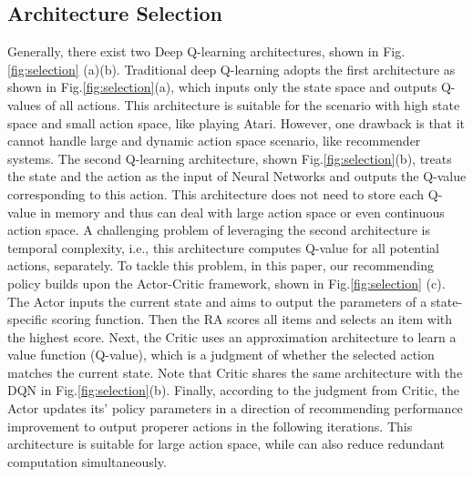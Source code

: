 \subsection{Architecture Selection}
Generally, there exist two Deep Q-learning architectures, shown in Fig.\ref{fig:selection} (a)(b). Traditional deep Q-learning adopts the first architecture as shown in Fig.\ref{fig:selection}(a), which inputs only the state space and outputs Q-values of all actions. This architecture is suitable for the scenario with high state space and small action space, like playing Atari\cite{mnih2013playing}. However, one drawback is that it cannot handle large and dynamic action space scenario, like recommender systems. The second Q-learning architecture, shown Fig.\ref{fig:selection}(b), treats the state and the action as the input of Neural Networks and outputs the Q-value corresponding to this action. This architecture does not need to store each Q-value in memory and thus can deal with large action space or even continuous action space. A challenging problem of leveraging the second architecture is temporal complexity, i.e., this architecture computes Q-value for all potential actions, separately. To tackle this problem, in this paper, our recommending policy builds upon the Actor-Critic framework\cite{sutton1998reinforcement}, shown in Fig.\ref{fig:selection} (c). The Actor inputs the current state and aims to output the parameters of a state-specific scoring function. Then the RA scores all items and selects an item with the highest score. Next, the Critic uses an approximation architecture to learn a value function (Q-value), which is a judgment of whether the selected action matches the current state. Note that Critic shares the same architecture with the DQN in Fig.\ref{fig:selection}(b).  Finally, according to the judgment from Critic, the Actor updates its' policy parameters in a direction of recommending performance improvement to output properer actions in the following iterations. This architecture is suitable for large action space, while can also reduce redundant computation simultaneously.

